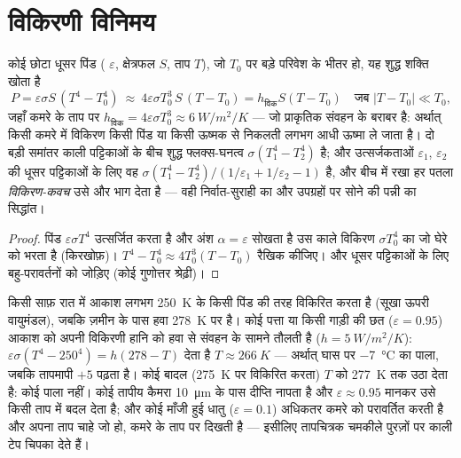 \section{विकिरणी विनिमय}

\begin{proposition}[शुद्ध विनिमय और विकिरणी गुणांक]\label{prop:b2:thermal-radiation:exchange}
कोई छोटा धूसर पिंड ( $\varepsilon$, क्षेत्रफल $S$, ताप $T$),
जो $T_0$ पर बड़े परिवेश के भीतर हो, यह शुद्ध शक्ति खोता है
\[
P = \varepsilon\sigma S\,(T^4 - T_0^4)
\ \approx\ 4\varepsilon\sigma T_0^3\,S\,(T - T_0) = h_{\text{विक}}S(T - T_0)
\quad\text{जब } |T - T_0| \ll T_0 ,
\]
जहाँ कमरे के ताप पर $h_{\text{विक}} = 4\varepsilon\sigma T_0^3 \approx \qty{6}{W/m^2/K}$
--- जो प्राकृतिक संवहन के बराबर है: अर्थात् किसी कमरे में
विकिरण किसी पिंड या किसी ऊष्मक से निकलती लगभग आधी ऊष्मा ले जाता है।
दो बड़ी समांतर काली पट्टिकाओं के बीच शुद्ध फ्लक्स-घनत्व
$\sigma(T_1^4 - T_2^4)$ है; और उत्सर्जकताओं $\varepsilon_1$, $\varepsilon_2$
की धूसर पट्टिकाओं के लिए वह $\sigma(T_1^4 - T_2^4)/(1/\varepsilon_1 + 1/\varepsilon_2
- 1)$ है, और बीच में रखा हर पतला \emph{विकिरण-कवच} उसे और
भाग देता है --- वही निर्वात-सुराही का और उपग्रहों पर सोने की पन्नी का
सिद्धांत।
\end{proposition}

\begin{proof}
पिंड $\varepsilon\sigma T^4$ उत्सर्जित करता है और अंश $\alpha =
\varepsilon$ सोखता है उस काले विकिरण $\sigma T_0^4$ का जो घेरे को भरता है
(किरखोफ़)। $T^4 - T_0^4 \approx 4T_0^3(T - T_0)$ रैखिक कीजिए। और धूसर
पट्टिकाओं के लिए बहु-परावर्तनों को जोड़िए (कोई गुणोत्तर श्रेढ़ी)।
\end{proof}

\begin{example}[साफ़ आकाश के नीचे पाला, और तापीय कैमरा]\label{ex:b2:thermal-radiation:frost}
किसी साफ़ रात में आकाश लगभग \qty{250}{K} के किसी पिंड की तरह विकिरित करता है
(सूखा ऊपरी वायुमंडल), जबकि ज़मीन के पास हवा
\qty{278}{K} पर है। कोई पत्ता या किसी गाड़ी की छत ($\varepsilon = 0.95$) आकाश को
अपनी विकिरणी हानि को हवा से संवहन के सामने तौलती है ($h =
\qty{5}{W/m^2/K}$): $\varepsilon\sigma(T^4 - 250^4) = h(278 - T)$ देता है $T
\approx \qty{266}{K}$ --- अर्थात् घास पर \qty{-7}{\celsius} का पाला, जबकि
तापमापी $+5$ पढ़ता है। कोई बादल (\qty{275}{K} पर विकिरित करता) $T$ को
\qty{277}{K} तक उठा देता है: कोई पाला नहीं। कोई तापीय कैमरा \qty{10}{\micro m}
के पास दीप्ति नापता है और $\varepsilon \approx 0.95$ मानकर उसे किसी ताप में
बदल देता है; और कोई माँजी हुई धातु ($\varepsilon = 0.1$) अधिकतर
कमरे को परावर्तित करती है और अपना ताप चाहे जो हो, कमरे के ताप पर दिखती है
--- इसीलिए तापचित्रक चमकीले पुरज़ों पर काली टेप चिपका देते हैं।
\end{example}

